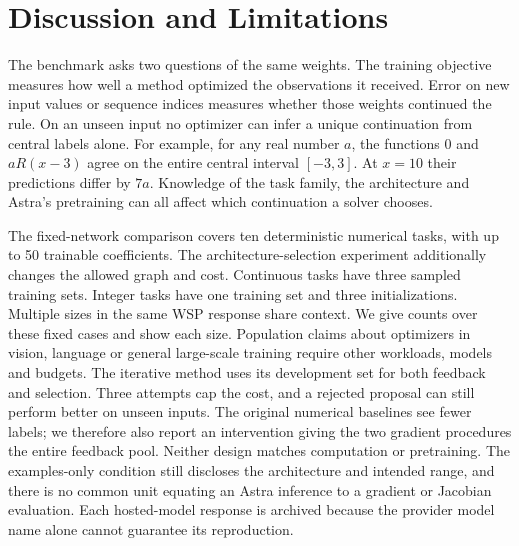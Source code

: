 \section{Discussion and Limitations}
The benchmark asks two questions of the same weights. The training objective measures how well a method optimized the observations it received. Error on new input values or sequence indices measures whether those weights continued the rule. On an unseen input no optimizer can infer a unique continuation from central labels alone. For example, for any real number $a$, the functions $0$ and $aR(x-3)$ agree on the entire central interval $[-3,3]$. At $x=10$ their predictions differ by $7a$. Knowledge of the task family, the architecture and Astra's pretraining can all affect which continuation a solver chooses.

The fixed-network comparison covers ten deterministic numerical tasks, with up to 50 trainable coefficients. The architecture-selection experiment additionally changes the allowed graph and cost. Continuous tasks have three sampled training sets. Integer tasks have one training set and three initializations. Multiple sizes in the same WSP response share context. We give counts over these fixed cases and show each size. Population claims about optimizers in vision, language or general large-scale training require other workloads, models and budgets. The iterative method uses its development set for both feedback and selection. Three attempts cap the cost, and a rejected proposal can still perform better on unseen inputs. The original numerical baselines see fewer labels; we therefore also report an intervention giving the two gradient procedures the entire feedback pool. Neither design matches computation or pretraining. The examples-only condition still discloses the architecture and intended range, and there is no common unit equating an Astra inference to a gradient or Jacobian evaluation. Each hosted-model response is archived because the provider model name alone cannot guarantee its reproduction.

